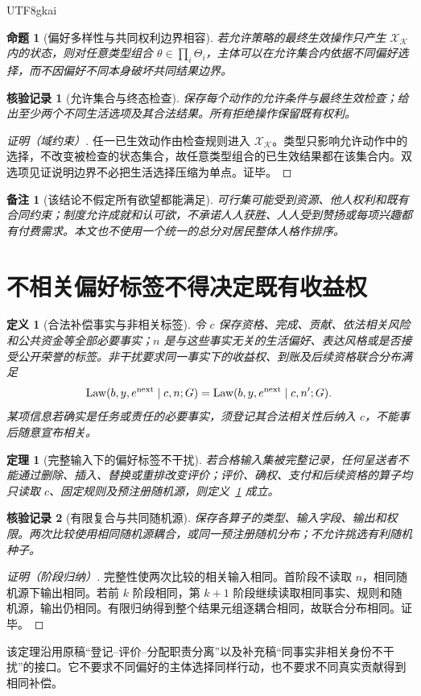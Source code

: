 \documentclass[12pt,a4paper,openany]{report}
\newtheorem{definition}{定义}[chapter]
\newtheorem{theorem}{定理}[chapter]
\newtheorem{proposition}{命题}[chapter]
\newtheorem{remark}{备注}[chapter]
\newtheorem{Certificate}{核验记录}[chapter]
\newcommand{\Charter}{\mathcal K}
\DeclareMathOperator{\LawDist}{Law}
\begin{document}
\begin{CJK*}{UTF8}{gkai}
\begin{proposition}[偏好多样性与共同权利边界相容]
\label{prop:plurality}
若允许策略的最终生效操作只产生 $\mathcal X_{\Charter}$ 内的状态，则对任意类型组合 $\theta\in\prod_i\Theta_i$，主体可以在允许集合内依据不同偏好选择，而不因偏好不同本身破坏共同结果边界。
\end{proposition}
\begin{Certificate}[允许集合与终态检查]
保存每个动作的允许条件与最终生效检查；给出至少两个不同生活选项及其合法结果。所有拒绝操作保留既有权利。
\end{Certificate}
\begin{proof}[证明（域约束）]
任一已生效动作由检查规则进入 $\mathcal X_{\Charter}$。类型只影响允许动作中的选择，不改变被检查的状态集合，故任意类型组合的已生效结果都在该集合内。双选项见证说明边界不必把生活选择压缩为单点。证毕。
\end{proof}

\begin{remark}[该结论不假定所有欲望都能满足]
可行集可能受到资源、他人权利和既有合同约束；制度允许成就和认可欲，不承诺人人获胜、人人受到赞扬或每项兴趣都有付费需求。本文也不使用一个统一的总分对居民整体人格作排序。
\end{remark}

\section{不相关偏好标签不得决定既有收益权}
\begin{definition}[合法补偿事实与非相关标签]
\label{def:noninterference}
令 $c$ 保存资格、完成、贡献、依法相关风险和公共资金等全部必要事实；$n$ 是与这些事实无关的生活偏好、表达风格或是否接受公开荣誉的标签。非干扰要求同一事实下的收益权、到账及后续资格联合分布满足
\[
 \LawDist(b,y,e^{\rm next}\mid c,n;G)
 =\LawDist(b,y,e^{\rm next}\mid c,n';G).
\]
某项信息若确实是任务或责任的必要事实，须登记其合法相关性后纳入 $c$，不能事后随意宣布相关。
\end{definition}

\begin{theorem}[完整输入下的偏好标签不干扰]
\label{thm:noninterference}
若合格输入集被完整记录，任何呈送者不能通过删除、插入、替换或重排改变评价；评价、确权、支付和后续资格的算子均只读取 $c$、固定规则及预注册随机源，则定义~\ref{def:noninterference} 成立。
\end{theorem}
\begin{Certificate}[有限复合与共同随机源]
保存各算子的类型、输入字段、输出和权限。两次比较使用相同随机源耦合，或同一预注册随机分布；不允许挑选有利随机种子。
\end{Certificate}
\begin{proof}[证明（阶段归纳）]
完整性使两次比较的相关输入相同。首阶段不读取 $n$，相同随机源下输出相同。若前 $k$ 阶段相同，第 $k+1$ 阶段继续读取相同事实、规则和随机源，输出仍相同。有限归纳得到整个结果元组逐耦合相同，故联合分布相同。证毕。
\end{proof}
该定理沿用原稿“登记--评价--分配职责分离”以及补充稿“同事实非相关身份不干扰”的接口\cite{SourceMarket,SourceSupplement}。它不要求不同偏好的主体选择同样行动，也不要求不同真实贡献得到相同补偿。


\end{CJK*}
\end{document}
